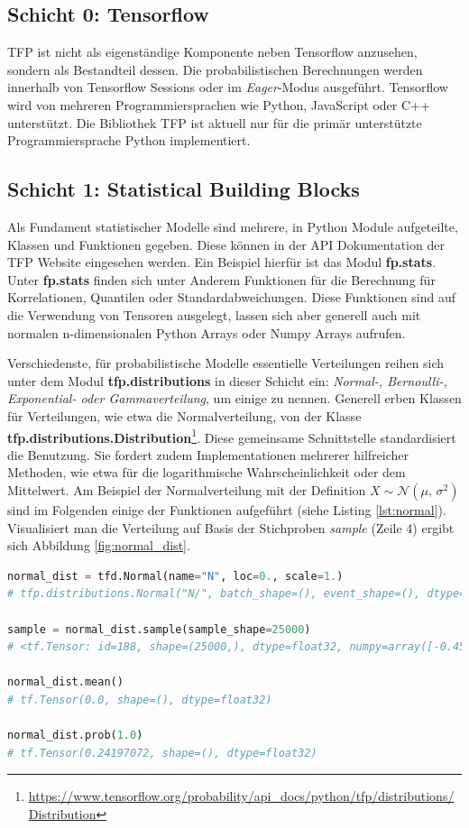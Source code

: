 \documentclass[12pt]{article}
\begin{document}
\subsection{Schicht 0: Tensorflow}
TFP ist nicht als eigenständige Komponente neben Tensorflow anzusehen, sondern als Bestandteil dessen. Die probabilistischen Berechnungen werden innerhalb von Tensorflow Sessions oder im \textit{Eager}-Modus ausgeführt. Tensorflow wird von mehreren Programmiersprachen wie Python, JavaScript oder C++ unterstützt. Die Bibliothek TFP ist aktuell nur für die primär unterstützte Programmiersprache Python implementiert.

\subsection{Schicht 1: Statistical Building Blocks}
\label{sec:buildingblocks}
Als Fundament statistischer Modelle sind mehrere, in Python Module aufgeteilte, Klassen und Funktionen gegeben. Diese können in der API Dokumentation der TFP Website eingesehen werden. Ein Beispiel hierfür ist das Modul \textbf{fp.stats}. Unter \textbf{fp.stats} finden sich unter Anderem Funktionen für die Berechnung für Korrelationen, Quantilen oder Standardabweichungen. Diese Funktionen sind auf die Verwendung von Tensoren ausgelegt, lassen sich aber generell auch mit normalen n-dimensionalen Python Arrays oder Numpy Arrays aufrufen.  

Verschiedenste, für probabilistische Modelle essentielle Verteilungen reihen sich unter dem Modul \textbf{tfp.distributions} in dieser Schicht ein: \textit{Normal-, Bernoulli-, Exponential- oder Gammaverteilung}, um einige zu nennen. Generell erben Klassen für Verteilungen, wie etwa die Normalverteilung, von der Klasse \textbf{tfp.distributions.Distribution}\footnote{\url{https://www.tensorflow.org/probability/api_docs/python/tfp/distributions/Distribution}}. Diese gemeinsame Schnittstelle standardisiert die Benutzung. Sie fordert zudem Implementationen mehrerer hilfreicher Methoden, wie etwa für die logarithmische Wahrscheinlichkeit oder dem Mittelwert. Am Beispiel der Normalverteilung mit der Definition $X \sim \mathcal{N}(\mu,\,\sigma^{2})$ sind im Folgenden einige der Funktionen aufgeführt (siehe Listing \ref{lst:normal}). Visualisiert man die Verteilung auf Basis der Stichproben \textit{sample} (Zeile 4) ergibt sich Abbildung \ref{fig:normal_dist}.

\begin{lstlisting}[language=Python, caption={Verwendung der Klasse tfp.distributions.Normal}, label={lst:normal}]
normal_dist = tfd.Normal(name="N", loc=0., scale=1.)
# tfp.distributions.Normal("N/", batch_shape=(), event_shape=(), dtype=float32)

sample = normal_dist.sample(sample_shape=25000)
# <tf.Tensor: id=188, shape=(25000,), dtype=float32, numpy=array([-0.45733708, -0.19126031, -0.33290815, ..., -1.1285563 , -0.6958163 ,  0.552399  ], dtype=float32)>

normal_dist.mean() 
# tf.Tensor(0.0, shape=(), dtype=float32)

normal_dist.prob(1.0) 
# tf.Tensor(0.24197072, shape=(), dtype=float32)
\end{lstlisting}
\end{document}
